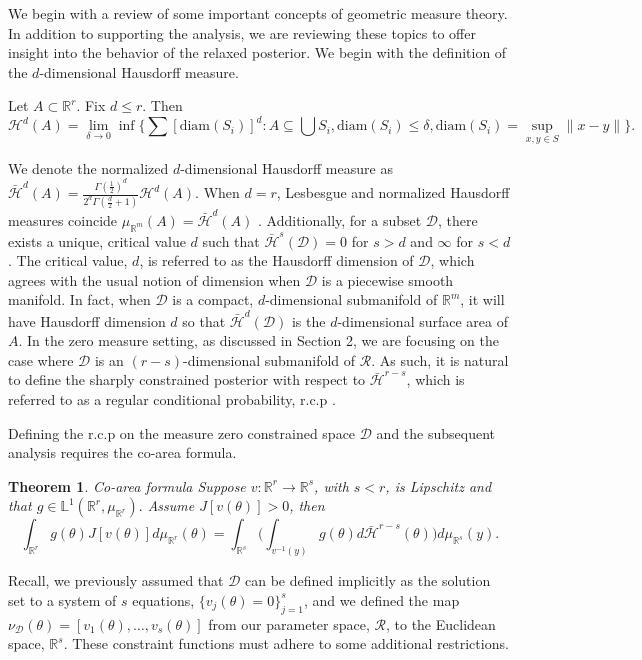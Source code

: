 \documentclass[10pt,fleqn]{article}
\newtheorem{theorem}{Theorem} \newtheorem{lemma}{Lemma}
\newcommand{\bb}[1]{\mathbb{#1}} \newcommand{\mc}[1]{\mathcal{#1}}
\DeclareMathOperator{\1}{\mathbbm{1}} \DeclareMathOperator{\bigO}{\mc O}
\begin{document}
We begin with a review of some important concepts of
geometric measure theory. In addition to supporting the analysis, we are reviewing these topics to offer insight into the behavior of the relaxed posterior.  We begin with the definition of the $d$-dimensional Hausdorff measure.  \begin{Hausdorff_def} Let
$A\subset \bb R^r$. Fix $d \le r$. Then $$\mc H^{d}(A)=
\underset{\delta\rightarrow 0}\lim \inf \bigg\{ \sum
\left[{\text{diam}(S_i)}\right]^d: {A\subseteq \bigcup S_i,
\text{diam}(S_i)\le \delta}, \text{diam}(S_i)=\sup_{x,y\in
S}\|x-y\|\bigg\}.$$  \end{Hausdorff_def} 
We denote the normalized $d$-dimensional Hausdorff
measure as $\bar{\mc H}^{d}(A) =\frac{\Gamma(\frac{1}{2})^{d}}{2^d
\Gamma(\frac{d}{2}+1)} \mc H^{d}(A)$. When $d=r$, Lesbesgue and normalized
Hausdorff measures coincide  $\mu_{\mathbb{R}^m}(A)= \bar{\mc H}^{d}(A)$
\citep{evans2015measure}.  Additionally, for a subset $\mathcal{D}$, there
exists a unique, critical value $d$ such that
$\bar{\mathcal{H}}^s(\mathcal{D}) = 0$ for $s>d$ and $\infty$ for $s<d$.
The critical value, $d$, is referred to as the Hausdorff dimension of $\mathcal{D}$, which agrees with the usual notion of dimension when $\mc D$ is a piecewise smooth manifold. In fact, when $\mathcal{D}$ is a
compact, $d$-dimensional submanifold of $\mathbb{R}^m$, it will have
Hausdorff dimension $d$ so that $\bar{\mathcal{H}}^d(\mathcal{D})$ is the
$d$-dimensional surface area of $A.$ In the zero measure setting, as discussed in Section 2, we are focusing on the case where $\mc D$ is an $(r-s)$-dimensional submanifold of $\mc R$. As such, it is natural to define the sharply constrained posterior with respect to $\bar{\mc H}^{r-s}$, which is referred to as a regular conditional probability, r.c.p \cite{diaconis2013manifold}.

Defining the r.c.p on the measure zero constrained space $\mathcal{D}$
and the subsequent analysis requires the co-area formula.
\begin{theorem}{Co-area formula \citep{diaconis2013manifold,
federer2014geometric}} Suppose $v:\mathbb{R}^r\to\mathbb{R}^s$,
with $s<r$, is Lipschitz and that
$g\in\mathbb{L}^1(\mathbb{R}^r,\mu_{\mathbb{R}^r}).$ Assume
$J[v(\theta)]>0$, then \begin{equation} \int_{\mathbb{R}^r}
g(\theta)J[v(\theta)]d\mu_{\mathbb{R}^r}( \theta)=
\int_{\mathbb{R}^s} \bigg( \int_{v^{-1}(y)}g(\theta)
d\bar{\mathcal{H}}^{r-s}(\theta)\bigg)d\mu_{\mathbb{R}^s}(y).
\end{equation} \end{theorem} Recall, we previously assumed that $\mathcal{D}$ can be defined implicitly as the
solution set to a system of $s$ equations,  $\{v_j(\theta)=0\}_{j=1}^s$, and we defined the map $\nu_{\mc D}(\theta) = [v_1(\theta),\dots,v_s(\theta)]$ from our parameter space, $\mc R$, to the Euclidean space, $ \mathbb{R}^s.$ These constraint functions must adhere to some additional restrictions.
\end{document}
